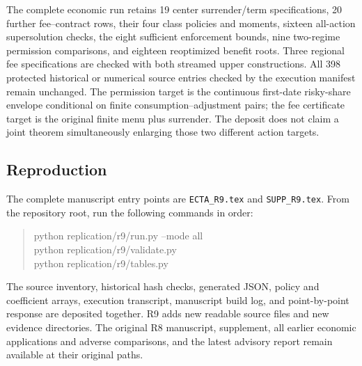 The complete economic run retains 19 center surrender/term specifications, 20 further fee--contract rows, their four class policies and moments, sixteen all-action supersolution checks, the eight sufficient enforcement bounds, nine two-regime permission comparisons, and eighteen reoptimized benefit roots. Three regional fee specifications are checked with both streamed upper constructions. All 398 protected historical or numerical source entries checked by the execution manifest remain unchanged. The permission target is the continuous first-date risky-share envelope conditional on finite consumption--adjustment pairs; the fee certificate target is the original finite menu plus surrender. The deposit does not claim a joint theorem simultaneously enlarging those two different action targets.

\subsection{Reproduction}
The complete manuscript entry points are \texttt{ECTA\_R9.tex} and \texttt{SUPP\_R9.tex}. From the repository root, run the following commands in order:
\begin{quote}\small\ttfamily
python replication/r9/run.py --mode all\\
python replication/r9/validate.py\\
python replication/r9/tables.py
\end{quote} The source inventory, historical hash checks, generated JSON, policy and coefficient arrays, execution transcript, manuscript build log, and point-by-point response are deposited together. R9 adds new readable source files and new evidence directories. The original R8 manuscript, supplement, all earlier economic applications and adverse comparisons, and the latest advisory report remain available at their original paths.
